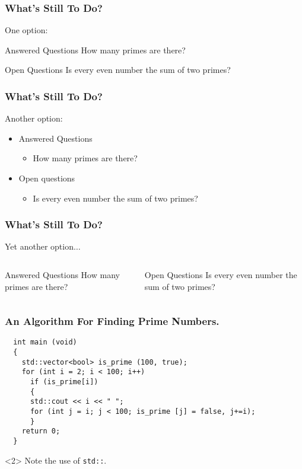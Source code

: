 \documentclass{beamer}
\begin{document}
  \begin{frame}
    \frametitle{What's Still To Do?}
    One option:
    \begin{block}{Answered Questions}
      How many primes are there?
    \end{block}
    \begin{block}{Open Questions}
      Is every even number the sum of two primes?
    \end{block}
  \end{frame}
  \begin{frame}
    \frametitle{What's Still To Do?}
    Another option:
    \begin{itemize}
      \item Answered Questions
      \begin{itemize}
        \item How many primes are there?
      \end{itemize}
      \item Open questions
      \begin{itemize}
        \item Is every even number the sum of two primes?
      \end{itemize}
    \end{itemize}
  \end{frame}
  \begin{frame}
    \frametitle{What's Still To Do?}
    Yet another option$\ldots$
    \begin{columns}[t]
      \begin{block}{Answered Questions}
        How many primes are there?
      \end{block}
      \pause
      \begin{block}{Open Questions}
        Is every even number the sum of two primes?
        \cite{Goldbach1742}
      \end{block}
    \end{columns}
  \end{frame}
  \begin{frame}[fragile]
    \frametitle{An Algorithm For Finding Prime Numbers.}
\begin{verbatim}
  int main (void)
  {
    std::vector<bool> is_prime (100, true);
    for (int i = 2; i < 100; i++)
      if (is_prime[i])
      {
      std::cout << i << " ";
      for (int j = i; j < 100; is_prime [j] = false, j+=i);
      }
    return 0;
  }
\end{verbatim}
    \begin{uncoverenv}<2>
      Note the use of \verb|std::|.
    \end{uncoverenv}
  \end{frame}
  
\end{document}
